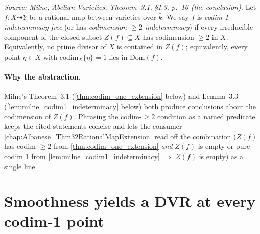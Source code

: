 \begin{definition}\leanok
  \label{def:codim_one_indeterminacy}
  \textit{Source: Milne, \emph{Abelian Varieties}, Theorem~3.1, \S I.3, p.~16 (the
  conclusion).}
  Let \(f \colon X \dashrightarrow Y\) be a rational map between varieties over \(\bar k\).
  We say \(f\) is \emph{codim-1-indeterminacy-free} (or has \emph{codimension-\(\geq 2\)
  indeterminacy}) if every irreducible component of the closed subset \(Z(f) \subseteq X\)
  has codimension \(\geq 2\) in \(X\). Equivalently, no prime divisor of \(X\) is contained in
  \(Z(f)\); equivalently, every point \(\eta \in X\) with \(\mathrm{codim}_X \overline{\{\eta\}} = 1\)
  lies in \(\mathrm{Dom}(f)\).

  \paragraph{Why the abstraction.} Milne's Theorem~3.1 (\cref{thm:codim_one_extension}
  below) and Lemma~3.3 (\cref{lem:milne_codim1_indeterminacy} below) both produce
  conclusions about the codimension of \(Z(f)\). Phrasing the codim-\(\geq 2\) condition
  as a named predicate keeps the cited statements concise and lets the consumer
  \cref{chap:Albanese_Thm32RationalMapExtension} read off the combination
  (\(Z(f)\) has codim \(\geq 2\) from \cref{thm:codim_one_extension} \emph{and} \(Z(f)\) is
  empty or pure codim 1 from \cref{lem:milne_codim1_indeterminacy} \(\Rightarrow\) \(Z(f)\)
  is empty) as a single line.
\end{definition}

\section{Smoothness yields a DVR at every codim-1 point}
\label{sec:smooth_dvr}


